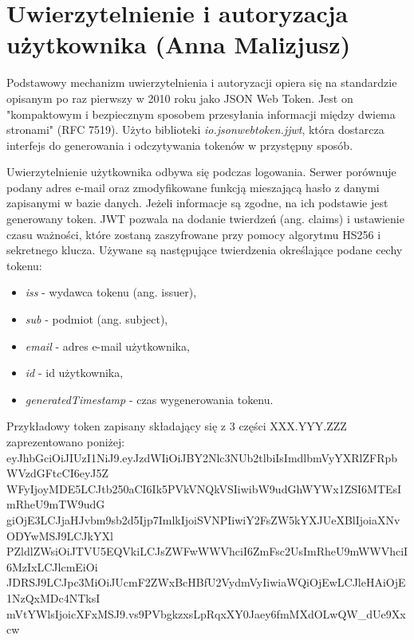 \documentclass[10pt,twoside,a4paper]{report}
\begin{document}
\section{Uwierzytelnienie i autoryzacja użytkownika (Anna Malizjusz)}
\par Podstawowy mechanizm uwierzytelnienia i autoryzacji opiera się na standardzie opisanym po raz pierwszy w 2010 roku jako JSON Web Token. Jest on "kompaktowym i bezpiecznym sposobem przesyłania informacji między dwiema stronami" (RFC 7519\cite{JWT}). Użyto biblioteki \textit{io.jsonwebtoken.jjwt}\cite{JWT library}, która dostarcza interfejs do generowania i odczytywania tokenów w przystępny sposób.

\par Uwierzytelnienie użytkownika odbywa się podczas logowania. Serwer porównuje podany adres e-mail oraz zmodyfikowane funkcją mieszającą hasło z danymi zapisanymi w bazie danych. Jeżeli informacje są zgodne, na ich podstawie jest generowany token. JWT pozwala na dodanie twierdzeń (ang. claims) i ustawienie czasu ważności, które zostaną zaszyfrowane przy pomocy algorytmu HS256 i sekretnego klucza. Używane są następujące twierdzenia określające podane cechy tokenu:
\begin{itemize}
\item \textit{iss} - wydawca tokenu (ang. issuer),
\item \textit{sub} - podmiot (ang. subject),
\item \textit{email} - adres e-mail użytkownika,
\item \textit{id} - id użytkownika,
\item \textit{generatedTimestamp} - czas wygenerowania tokenu.
\end{itemize}
\par Przykładowy token zapisany składający się z 3 części XXX.YYY.ZZZ zaprezentowano poniżej:\\eyJhbGciOiJIUzI1NiJ9.eyJzdWIiOiJBY2Nlc3NUb2tlbiIsImdlbmVyYXRlZFRpbWVzdGFtcCI6eyJ5Z\\WFyIjoyMDE5LCJtb250aCI6Ik5PVkVNQkVSIiwibW9udGhWYWx1ZSI6MTEsImRheU9mTW9udG\\
giOjE3LCJjaHJvbm9sb2d5Ijp7ImlkIjoiSVNPIiwiY2FsZW5kYXJUeXBlIjoiaXNvODYwMSJ9LCJkYXl\\
PZldlZWsiOiJTVU5EQVkiLCJsZWFwWWVhciI6ZmFsc2UsImRheU9mWWVhciI6MzIxLCJlcmEiOi\\
JDRSJ9LCJpc3MiOiJUcmF2ZWxBcHBfU2VydmVyIiwiaWQiOjEwLCJleHAiOjE1NzQxMDc4NTksI\\mVtYWlsIjoicXFxMSJ9.vs9PVbgkzxsLpRqxXY0Jaey6fmMXdOLwQW\_dUe9Xxcw
\end{document}
